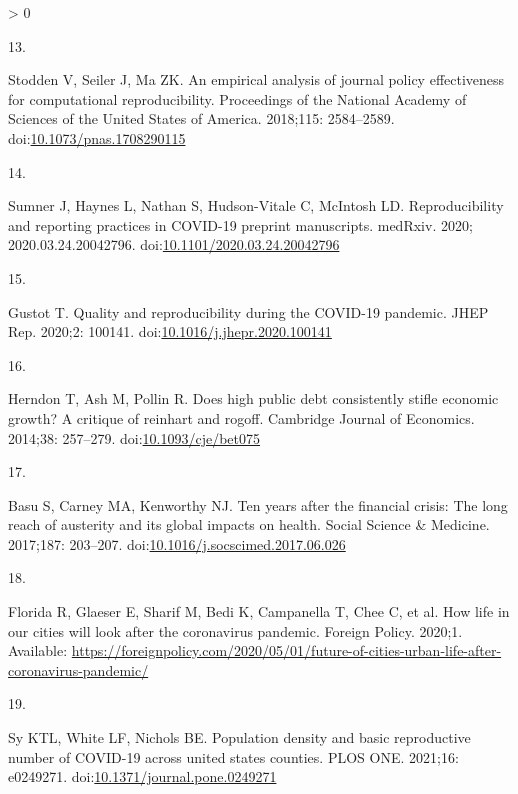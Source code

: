 \documentclass[10pt,letterpaper]{article}
\newlength{\csllabelwidth}
\newlength{\cslhangindent}
\newenvironment{CSLReferences}[3] %
 {%
  \setlength{\parindent}{0pt}
  \ifodd #1 \everypar{\setlength{\hangindent}{\cslhangindent}}\ignorespaces\fi
  \ifnum #2 > 0
  \setlength{\parskip}{#2\baselineskip}
  \fi
 }%
 {}
\newcommand{\CSLLeftMargin}[1]{\parbox[t]{\csllabelwidth}{#1}}
\newcommand{\CSLRightInline}[1]{\parbox[t]{\linewidth - \csllabelwidth}{#1}}
\begin{document}
\begin{CSLReferences}{0}{0}
\leavevmode\hypertarget{ref-Stodden2018empirical}{}%
\CSLLeftMargin{13. }
\CSLRightInline{Stodden V, Seiler J, Ma ZK. An empirical analysis of
journal policy effectiveness for computational reproducibility.
Proceedings of the National Academy of Sciences of the United States of
America. 2018;115: 2584--2589.
doi:\href{https://doi.org/10.1073/pnas.1708290115}{10.1073/pnas.1708290115}}

\leavevmode\hypertarget{ref-Sumner2020reproducibility}{}%
\CSLLeftMargin{14. }
\CSLRightInline{Sumner J, Haynes L, Nathan S, Hudson-Vitale C, McIntosh
LD. Reproducibility and reporting practices in COVID-19 preprint
manuscripts. medRxiv. 2020; 2020.03.24.20042796.
doi:\href{https://doi.org/10.1101/2020.03.24.20042796}{10.1101/2020.03.24.20042796}}

\leavevmode\hypertarget{ref-Gustot2020quality}{}%
\CSLLeftMargin{15. }
\CSLRightInline{Gustot T. Quality and reproducibility during the
COVID-19 pandemic. JHEP Rep. 2020;2: 100141.
doi:\href{https://doi.org/10.1016/j.jhepr.2020.100141}{10.1016/j.jhepr.2020.100141}}

\leavevmode\hypertarget{ref-Herndon2014high}{}%
\CSLLeftMargin{16. }
\CSLRightInline{Herndon T, Ash M, Pollin R. Does high public debt
consistently stifle economic growth? A critique of reinhart and rogoff.
Cambridge Journal of Economics. 2014;38: 257--279.
doi:\href{https://doi.org/10.1093/cje/bet075}{10.1093/cje/bet075}}

\leavevmode\hypertarget{ref-Basu2017ten}{}%
\CSLLeftMargin{17. }
\CSLRightInline{Basu S, Carney MA, Kenworthy NJ. Ten years after the
financial crisis: The long reach of austerity and its global impacts on
health. Social Science \& Medicine. 2017;187: 203--207.
doi:\href{https://doi.org/10.1016/j.socscimed.2017.06.026}{10.1016/j.socscimed.2017.06.026}}

\leavevmode\hypertarget{ref-Florida2020how}{}%
\CSLLeftMargin{18. }
\CSLRightInline{Florida R, Glaeser E, Sharif M, Bedi K, Campanella T,
Chee C, et al. How life in our cities will look after the coronavirus
pandemic. Foreign Policy. 2020;1. Available:
\url{https://foreignpolicy.com/2020/05/01/future-of-cities-urban-life-after-coronavirus-pandemic/}}

\leavevmode\hypertarget{ref-Sy2021population}{}%
\CSLLeftMargin{19. }
\CSLRightInline{Sy KTL, White LF, Nichols BE. Population density and
basic reproductive number of COVID-19 across united states counties.
PLOS ONE. 2021;16: e0249271.
doi:\href{https://doi.org/10.1371/journal.pone.0249271}{10.1371/journal.pone.0249271}}


\end{CSLReferences}
\end{document}
